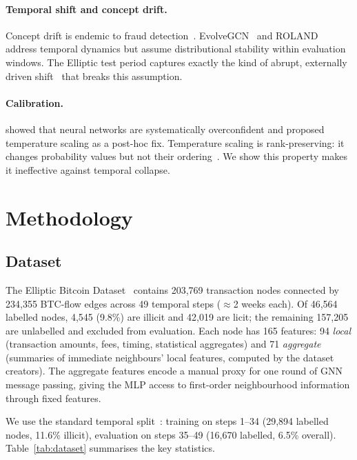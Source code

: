 \documentclass[11pt]{article}
\begin{document}
\paragraph{Temporal shift and concept drift.}
Concept drift is endemic to fraud
detection~\citep{gama2014survey,lu2018drift}.
EvolveGCN~\citep{pareja2020evolvegcn} and
ROLAND~\citep{you2022roland} address temporal dynamics but assume
distributional stability within evaluation windows.  The Elliptic test
period captures exactly the kind of abrupt, externally driven
shift~\citep{quinonero2009shift} that breaks this assumption.

\paragraph{Calibration.}
\citet{guo2017calibration} showed that neural networks are
systematically overconfident and proposed temperature scaling as a
post-hoc fix.  Temperature scaling is rank-preserving: it changes
probability values but not their
ordering~\citep{naeini2015calibration}.  We show this property makes
it ineffective against temporal collapse.

\section{Methodology}
\label{sec:methods}

\subsection{Dataset}

The Elliptic Bitcoin Dataset~\citep{weber2019} contains 203,769
transaction nodes connected by 234,355 BTC-flow edges across 49
temporal steps ($\approx$2 weeks each).  Of 46,564 labelled nodes,
4,545 (9.8\%) are illicit and 42,019 are licit; the remaining
157,205 are unlabelled and excluded from evaluation.  Each node has
165 features: 94 \emph{local} (transaction amounts, fees, timing,
statistical aggregates) and 71 \emph{aggregate} (summaries of
immediate neighbours' local features, computed by the dataset
creators).  The aggregate features encode a manual proxy for one
round of GNN message passing, giving the MLP access to first-order
neighbourhood information through fixed features.

We use the standard temporal split~\citep{pareja2020evolvegcn}:
training on steps 1--34 (29,894 labelled nodes, 11.6\% illicit),
evaluation on steps 35--49 (16,670 labelled, 6.5\% overall).
Table~\ref{tab:dataset} summarises the key statistics.
\end{document}
